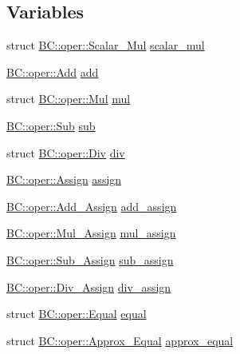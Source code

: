 \subsection*{Variables}
\begin{DoxyCompactItemize}
\item 
struct \hyperlink{structBC_1_1oper_1_1Scalar__Mul}{B\+C\+::oper\+::\+Scalar\+\_\+\+Mul} \hyperlink{namespaceBC_1_1oper_aa77191efbcb645a6ceda7e0fb7ac6843}{scalar\+\_\+mul}
\item 
\hyperlink{structBC_1_1oper_1_1Add}{B\+C\+::oper\+::\+Add} \hyperlink{namespaceBC_1_1oper_a9abd1b1482fb204f15035685456462a9}{add}
\item 
struct \hyperlink{structBC_1_1oper_1_1Mul}{B\+C\+::oper\+::\+Mul} \hyperlink{namespaceBC_1_1oper_aab26ff6ee1216f242214fc8b6674c32e}{mul}
\item 
\hyperlink{structBC_1_1oper_1_1Sub}{B\+C\+::oper\+::\+Sub} \hyperlink{namespaceBC_1_1oper_a66bc482a0e886673336e8fb49ec1d882}{sub}
\item 
struct \hyperlink{structBC_1_1oper_1_1Div}{B\+C\+::oper\+::\+Div} \hyperlink{namespaceBC_1_1oper_a8f2966c9c1032ab34cc5f042840252d0}{div}
\item 
\hyperlink{structBC_1_1oper_1_1Assign}{B\+C\+::oper\+::\+Assign} \hyperlink{namespaceBC_1_1oper_ae9e3a9b05e55c759bd944ce0b2a7cf77}{assign}
\item 
\hyperlink{structBC_1_1oper_1_1Add__Assign}{B\+C\+::oper\+::\+Add\+\_\+\+Assign} \hyperlink{namespaceBC_1_1oper_ab49f6a815bf77c8acda88d438b6c9bd3}{add\+\_\+assign}
\item 
\hyperlink{structBC_1_1oper_1_1Mul__Assign}{B\+C\+::oper\+::\+Mul\+\_\+\+Assign} \hyperlink{namespaceBC_1_1oper_ab178d6cfe370e3569fea8a85ccf5647a}{mul\+\_\+assign}
\item 
\hyperlink{structBC_1_1oper_1_1Sub__Assign}{B\+C\+::oper\+::\+Sub\+\_\+\+Assign} \hyperlink{namespaceBC_1_1oper_a75786bbf0065b4f36759ee9e4c3abd4b}{sub\+\_\+assign}
\item 
\hyperlink{structBC_1_1oper_1_1Div__Assign}{B\+C\+::oper\+::\+Div\+\_\+\+Assign} \hyperlink{namespaceBC_1_1oper_adfd7f606b9c602cf11ed3d56edba457d}{div\+\_\+assign}
\item 
struct \hyperlink{structBC_1_1oper_1_1Equal}{B\+C\+::oper\+::\+Equal} \hyperlink{namespaceBC_1_1oper_a7ce658d5413801111ce7e05b7622b94d}{equal}
\item 
struct \hyperlink{structBC_1_1oper_1_1Approx__Equal}{B\+C\+::oper\+::\+Approx\+\_\+\+Equal} \hyperlink{namespaceBC_1_1oper_a2619e251431022a4414ca2d48cb04bd9}{approx\+\_\+equal}

\end{DoxyCompactItemize}
